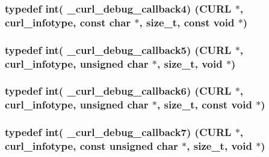 \subsubsection[{\texorpdfstring{\+\_\+curl\+\_\+debug\+\_\+callback4}{_curl_debug_callback4}}]{\setlength{\rightskip}{0pt plus 5cm}typedef int( \+\_\+curl\+\_\+debug\+\_\+callback4) ({\bf C\+U\+RL} $\ast$, {\bf curl\+\_\+infotype}, const char $\ast$, size\+\_\+t, const void $\ast$)}\hypertarget{typecheck-gcc_8h_a8577cd6fbe76c09f0e0242d94f842651}{}\label{typecheck-gcc_8h_a8577cd6fbe76c09f0e0242d94f842651}
\subsubsection[{\texorpdfstring{\+\_\+curl\+\_\+debug\+\_\+callback5}{_curl_debug_callback5}}]{\setlength{\rightskip}{0pt plus 5cm}typedef int( \+\_\+curl\+\_\+debug\+\_\+callback5) ({\bf C\+U\+RL} $\ast$, {\bf curl\+\_\+infotype}, unsigned char $\ast$, size\+\_\+t, void $\ast$)}\hypertarget{typecheck-gcc_8h_a413cefc946d02050fd8ed446fb16d4af}{}\label{typecheck-gcc_8h_a413cefc946d02050fd8ed446fb16d4af}
\subsubsection[{\texorpdfstring{\+\_\+curl\+\_\+debug\+\_\+callback6}{_curl_debug_callback6}}]{\setlength{\rightskip}{0pt plus 5cm}typedef int( \+\_\+curl\+\_\+debug\+\_\+callback6) ({\bf C\+U\+RL} $\ast$, {\bf curl\+\_\+infotype}, unsigned char $\ast$, size\+\_\+t, const void $\ast$)}\hypertarget{typecheck-gcc_8h_a125129a4ee026e1ba2ea8bffc369e894}{}\label{typecheck-gcc_8h_a125129a4ee026e1ba2ea8bffc369e894}
\subsubsection[{\texorpdfstring{\+\_\+curl\+\_\+debug\+\_\+callback7}{_curl_debug_callback7}}]{\setlength{\rightskip}{0pt plus 5cm}typedef int( \+\_\+curl\+\_\+debug\+\_\+callback7) ({\bf C\+U\+RL} $\ast$, {\bf curl\+\_\+infotype}, const unsigned char $\ast$, size\+\_\+t, void $\ast$)}\hypertarget{typecheck-gcc_8h_ae964409993dea78229a06595a232b8c6}{}\label{typecheck-gcc_8h_ae964409993dea78229a06595a232b8c6}
